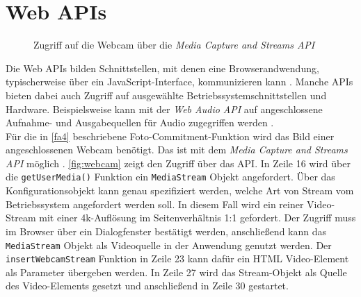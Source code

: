 \section{Web APIs}
\label{sec:web-apis}

\begin{figure}
  
  \caption{Zugriff auf die Webcam über die \emph{Media Capture and Streams API}}
  \label{fig:webcam}
\end{figure}

Die Web APIs bilden Schnittstellen, mit denen eine Browserandwendung, typischerweise über ein JavaScript-Interface,
kommunizieren kann \cite{web-apis}. Manche APIs bieten dabei auch Zugriff auf ausgewählte 
Betriebssystemschnittstellen und Hardware. Beispielsweise kann mit der \emph{Web Audio API} auf 
angeschlossene Aufnahme- und Ausgabequellen für Audio zugegriffen werden \cite{web-audio-api}.\\
Für die in \ref{fa4} beschriebene
Foto-Commitment-Funktion wird das Bild einer angeschlossenen Webcam benötigt. Das ist mit dem \emph{Media Capture and 
Streams API} möglich \cite{media-stream}. \autoref{fig:webcam} zeigt den Zugriff über das API. In Zeile 16 wird 
über die \texttt{getUserMedia()} Funktion ein \texttt{MediaStream} Objekt angefordert. Über das Konfigurationsobjekt
kann genau spezifiziert werden, welche Art von Stream vom Betriebssystem angefordert werden soll. In diesem Fall
wird ein reiner Video-Stream mit einer 4k-Auflösung im Seitenverhältnis 1:1 gefordert. Der Zugriff muss 
im Browser über ein Dialogfenster bestätigt werden, anschließend kann das \texttt{MediaStream} Objekt als
Videoquelle in der Anwendung genutzt werden. Der \texttt{insertWebcamStream} Funktion in Zeile 23 kann dafür
ein HTML Video-Element als Parameter übergeben werden. In Zeile 27 wird das Stream-Objekt als Quelle
des Video-Elements gesetzt und anschließend in Zeile 30 gestartet.

\iffalse
- Web USB
- 
\fi